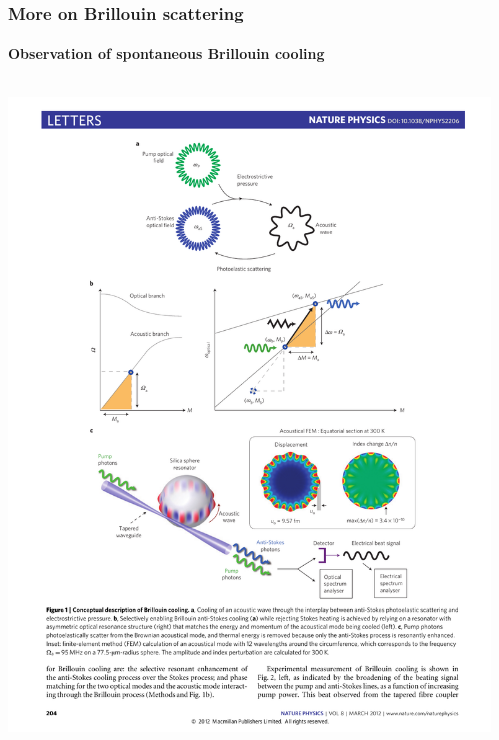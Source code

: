 \documentclass{beamer}
\begin{document}
\begin{frame}
\frametitle{More on Brillouin scattering}
\framesubtitle{Observation of spontaneous Brillouin cooling}

\vspace{4em}

\begin{columns}[onlytextwidth]
\begin{column}{0.6\textwidth}
\begin{center}
\includegraphics[width=1.0\columnwidth]{f6.pdf}
\end{center}
\end{column}
\begin{column}{0.4\textwidth}
\begin{center}

\end{center}
\end{column}
\end{columns}
\end{frame}
\end{document}
